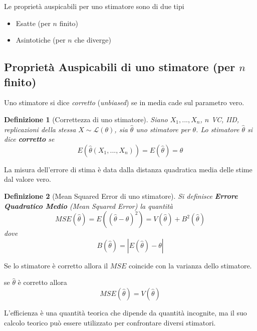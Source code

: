 \documentclass[
  11pt,
]{book}
\providecommand{\tightlist}{%
  \setlength{\itemsep}{0pt}\setlength{\parskip}{0pt}}
\theoremstyle{mytheoremstyle}
\theoremstyle{mydefstyle}
\newtheorem{definition}{Definizione}[section]
\begin{document}
Le proprietà auspicabili per uno stimatore sono di due tipi

\begin{itemize}
\tightlist
\item
  Esatte (per \(n\) finito)
\item
  Asintotiche (per \(n\) che diverge)
\end{itemize}

\subsection{\texorpdfstring{Proprietà Auspicabili di uno stimatore (per \(n\) finito)}{Proprietà Auspicabili di uno stimatore (per n finito)}}\label{proprietuxe0-auspicabili-di-uno-stimatore-per-n-finito}

Uno stimatore si dice \emph{corretto} (\emph{unbiased}) se in media cade sul parametro vero.

\begin{info}

\begin{definition}[Correttezza di uno stimatore]
Siano \(X_1,...,X_n\), \(n\) VC, IID, replicazioni della stessa \(X\sim\mathscr{L}(\theta)\), sia \(\hat\theta\) uno stimatore per \(\theta\).
Lo stimatore \(\hat\theta\) si dice \textbf{corretto} se
\[
E(\hat\theta(X_1,...,X_n))=E(\hat\theta)=\theta
\]
\end{definition}

\end{info}

La misura dell'errore di stima è data dalla distanza quadratica media delle stime dal valore vero.

\begin{info}

\begin{definition}[Mean Squared Error di uno stimatore]
Si definisce \textbf{Errore Quadratico Medio} (\emph{Mean Squared Error}) la quantità
\[MSE(\hat\theta)=E((\hat\theta-\theta)^2)=V(\hat\theta)+B^2(\hat\theta)\]
dove
\[B(\hat\theta)=|E(\hat\theta)-\theta|\]
\end{definition}

\end{info}

Se lo stimatore è corretto allora il \(MSE\) coincide con la varianza dello stimatore.

se \(\hat\theta\) è corretto allora
\[MSE(\hat\theta)=V(\hat\theta)\]

L'efficienza è una quantità teorica che dipende da quantità incognite, ma il suo calcolo teorico può essere utilizzato per confrontare diversi stimatori.
\end{document}
